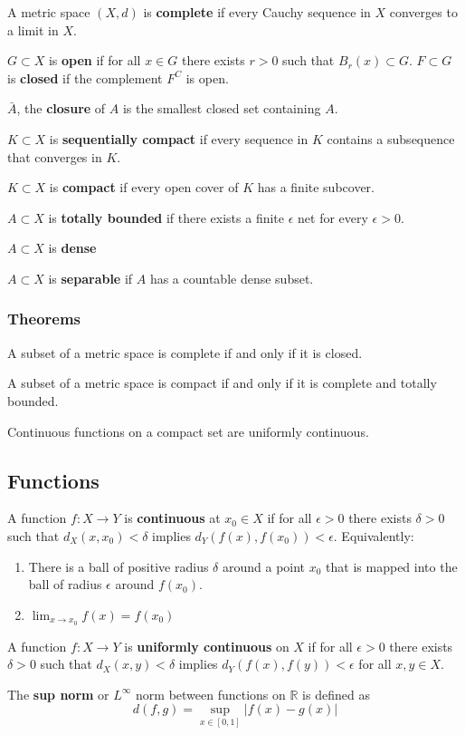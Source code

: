 \documentclass[12pt]{article}
\begin{document}
A metric space $(X, d)$ is \textbf{complete} if every Cauchy sequence in $X$
converges to a limit in $X$.

$G \subset X$ is \textbf{open} if for all $x \in G$ there exists $r > 0$
such that $B_r (x) \subset G$. $F \subset G$ is \textbf{closed} if the complement
$F^C$ is open.

$\bar{A}$, the \textbf{closure} of $A$ is the smallest closed set
containing $A$.

$K \subset X$ is \textbf{sequentially compact} if every sequence in $K$
contains a subsequence that converges in $K$.

$K \subset X$ is \textbf{compact} if every open cover of $K$ has a finite
subcover.

$A \subset X$ is \textbf{totally bounded} if there exists a finite
$\epsilon$ net for every $\epsilon > 0$.

$A \subset X$ is \textbf{dense} 

$A \subset X$ is \textbf{separable} if $A$ has a countable dense subset.
\subsubsection{Theorems}

A subset of a metric space is complete if and only if it is closed.

A subset of a metric space is compact if and only if it is complete and
totally bounded.

Continuous functions on a compact set are uniformly continuous.

\subsection{Functions}

A function $f : X \rightarrow Y$ is \textbf{continuous} at $x_0 \in X$ if
for all $\epsilon > 0$ there exists $\delta > 0$ such that $d_X(x, x_0) <
\delta$ implies $d_Y(f(x), f(x_0)) < \epsilon$. Equivalently:
\begin{enumerate}
    \item There is a ball of positive radius $\delta$
    around a point $x_0$ that is mapped into the ball of radius $\epsilon$ around
    $f(x_0)$.
    \item $\lim_{x \rightarrow x_0} f(x) = f(x_0)$
\end{enumerate}

A function $f : X \rightarrow Y$ is \textbf{uniformly continuous} on $X$ if 
for all $\epsilon > 0$ there exists $\delta > 0$ such that $d_X(x, y) <
\delta$ implies $d_Y(f(x), f(y)) < \epsilon$ for all $x, y \in X$. 

The \textbf{sup norm} or $L^\infty$ norm between functions on $\mathbb{R}$
is defined as
\[
    d(f, g) = \sup_{x \in [0, 1]} |f(x) - g(x)|
\]
\end{document}
